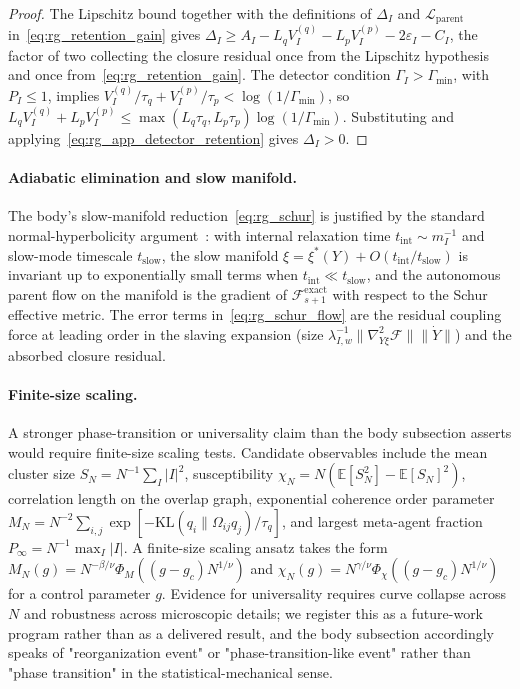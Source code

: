 \documentclass[11pt]{article}
\begin{document}
\begin{proof}
The Lipschitz bound together with the definitions of $\Delta_I$ and $\mathcal{L}_{\mathrm{parent}}$ in~\eqref{eq:rg_retention_gain} gives $\Delta_I \ge A_I - L_q V_I^{(q)} - L_p V_I^{(p)} - 2\varepsilon_I - C_I$, the factor of two collecting the closure residual once from the Lipschitz hypothesis and once from~\eqref{eq:rg_retention_gain}. The detector condition $\Gamma_I > \Gamma_{\min}$, with $P_I \le 1$, implies $V_I^{(q)}/\tau_q + V_I^{(p)}/\tau_p < \log(1/\Gamma_{\min})$, so $L_q V_I^{(q)} + L_p V_I^{(p)} \le \max(L_q\tau_q, L_p\tau_p)\log(1/\Gamma_{\min})$. Substituting and applying~\eqref{eq:rg_app_detector_retention} gives $\Delta_I > 0$.
\end{proof}

\paragraph{Adiabatic elimination and slow manifold.}
The body's slow-manifold reduction~\eqref{eq:rg_schur} is justified by the standard normal-hyperbolicity argument~\cite{fenichel1979geometric}: with internal relaxation time $t_{\mathrm{int}} \sim m_I^{-1}$ and slow-mode timescale $t_{\mathrm{slow}}$, the slow manifold $\xi = \xi^*(Y) + O(t_{\mathrm{int}}/t_{\mathrm{slow}})$ is invariant up to exponentially small terms when $t_{\mathrm{int}} \ll t_{\mathrm{slow}}$, and the autonomous parent flow on the manifold is the gradient of $\mathcal{F}_{s+1}^{\mathrm{exact}}$ with respect to the Schur effective metric. The error terms in~\eqref{eq:rg_schur_flow} are the residual coupling force at leading order in the slaving expansion (size $\lambda_{I,w}^{-1}\|\nabla^2_{Y\xi}\mathcal{F}\|\|\dot Y\|$) and the absorbed closure residual.

\paragraph{Finite-size scaling.}
A stronger phase-transition or universality claim than the body subsection asserts would require finite-size scaling tests. Candidate observables include the mean cluster size $S_N = N^{-1}\sum_I |I|^2$, susceptibility $\chi_N = N(\mathbb{E}[S_N^2] - \mathbb{E}[S_N]^2)$, correlation length on the overlap graph, exponential coherence order parameter $M_N = N^{-2}\sum_{i,j}\exp[-\mathrm{KL}(q_i \| \Omega_{ij}q_j)/\tau_q]$, and largest meta-agent fraction $P_\infty = N^{-1}\max_I |I|$. A finite-size scaling ansatz takes the form $M_N(g) = N^{-\beta/\nu}\Phi_M((g - g_c)N^{1/\nu})$ and $\chi_N(g) = N^{\gamma/\nu}\Phi_\chi((g - g_c)N^{1/\nu})$ for a control parameter $g$. Evidence for universality requires curve collapse across $N$ and robustness across microscopic details; we register this as a future-work program rather than as a delivered result, and the body subsection accordingly speaks of "reorganization event" or "phase-transition-like event" rather than "phase transition" in the statistical-mechanical sense.
\end{document}
